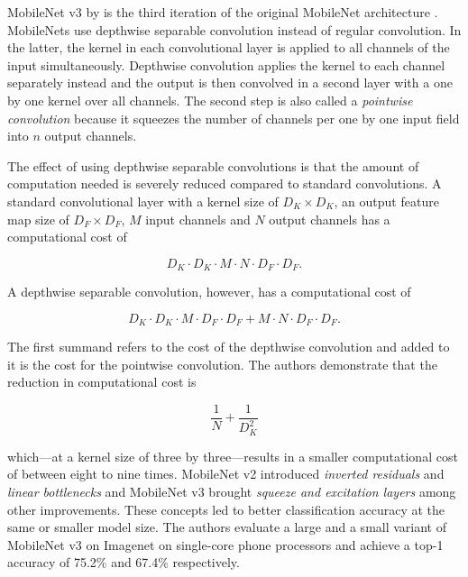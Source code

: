 \documentclass[draft,final]{vutinfth} %
\begin{document}
MobileNet v3 by \textcite{howard2019} is the third iteration of the
original MobileNet architecture \cite{howard2017}. MobileNets use
depthwise separable convolution instead of regular convolution. In the
latter, the kernel in each convolutional layer is applied to all
channels of the input simultaneously. Depthwise convolution applies
the kernel to each channel separately instead and the output is then
convolved in a second layer with a one by one kernel over all
channels. The second step is also called a \emph{pointwise
convolution} because it squeezes the number of channels per one by one
input field into $n$ output channels.

The effect of using depthwise separable convolutions is that the
amount of computation needed is severely reduced compared to standard
convolutions. A standard convolutional layer with a kernel size of
$D_{K}\times D_{K}$, an output feature map size of $D_{F}\times D_{F}$, $M$
input channels and $N$ output channels has a computational cost of

\begin{equation}
  \label{eq:conv-comp-cost}
  D_{K}\cdot D_{K}\cdot M \cdot N \cdot D_{F}\cdot D_{F}.
\end{equation}

A depthwise separable convolution, however, has a computational cost of

\begin{equation}
  \label{eq:dwsconv-comp-cost}
  D_{K}\cdot D_{K}\cdot M \cdot D_{F}\cdot D_{F} + M \cdot N \cdot D_{F}\cdot D_{F}.
\end{equation}

The first summand refers to the cost of the depthwise convolution and
added to it is the cost for the pointwise convolution. The authors
demonstrate that the reduction in computational cost is

\begin{equation}
  \label{eq:dwsconv-comp-reduction}
  \frac{1}{N} + \frac{1}{D^{2}_{K}}
\end{equation}

which—at a kernel size of three by three—results in a smaller
computational cost of between eight to nine times. MobileNet v2
\cite{sandler2018} introduced \emph{inverted residuals} and
\emph{linear bottlenecks} and MobileNet v3 \cite{howard2019} brought
\emph{squeeze and excitation layers} among other improvements. These
concepts led to better classification accuracy at the same or smaller
model size. The authors evaluate a large and a small variant of
MobileNet v3 on Imagenet on single-core phone processors and achieve a
top-1 accuracy of 75.2\% and 67.4\% respectively.
\end{document}
